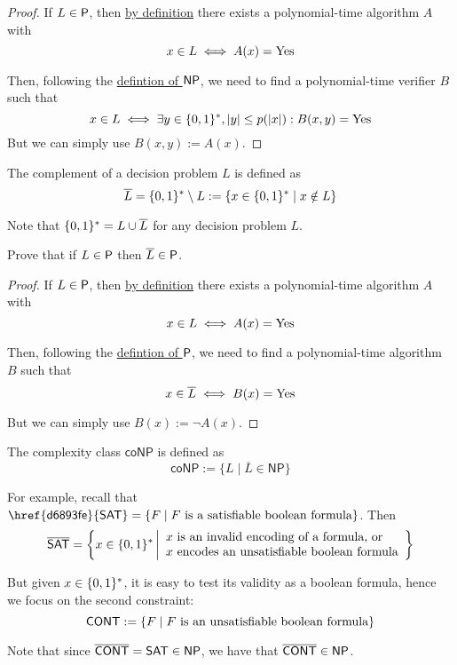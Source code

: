 \begin{proof}
	If $L\in\P$, then \href{ee3be28}{by definition} there exists a polynomial-time algorithm $A$ with
	$$x\in L\iff A(x)=\Yes$$

	Then, following the \href{d93050e}{defintion of $\NP$}, we need
	to find a polynomial-time verifier $B$ such that
	$$
		x\in L\iff\exists y\in\binrep,|y|\leq p(|x|):B(x,y)=\Yes
	$$
	But we can simply use $B(x,y):=A(x)$.
\end{proof}

\label{f636043}

The complement of a decision problem $L$ is defined as
$$
	\overline L=\binrep\setminus L:=\{x\in\binrep\mid x\notin L\}
$$

Note that $\binrep=L\cup\overline L$ for any decision problem $L$.

\label{da1567b}

Prove that if $L\in\P$ then $\overline L\in\P$.

\begin{proof}
  If $L\in\P$, then \href{ee3be28}{by definition} there exists a
  polynomial-time algorithm $A$ with $$x\in L\iff A(x)=\Yes$$

	Then, following the \href{ee3be28}{defintion of $\P$}, we need
	to find a polynomial-time algorithm $B$ such that
	$$x\in\overline L\iff B(x)=\Yes$$

	But we can simply use $B(x):=\neg A(x)$.
\end{proof}

\label{a92ed96}

The complexity class $\mathsf{coNP}$ is defined as
$$
	\mathsf{coNP}:=\{L\mid\overline L\in\mathsf{NP}\}
$$

For example, recall that $\mathsf{\href{d6893fe}{SAT}}=\{F\mid
	F\text{ is a satisfiable boolean formula}\}$. Then
$$
	\overline{\SAT}=\left\{x\in\binrep\, \middle\vert
	\begin{array}{l}
		\text{$x$ is an invalid encoding of a formula, or} \\
		\text{$x$ encodes an unsatisfiable boolean formula}
	\end{array}
	\right\}
$$

But given $x\in\binrep$, it is easy to test its validity as a boolean
formula, hence we focus on the second constraint:
$$
	\CONT:=\{F\mid F\text{ is an unsatisfiable boolean formula}\}
$$

Note that since $\overline{\CONT}=\SAT\in\NP$, we have that
$\overline{\CONT}\in\NP$.

